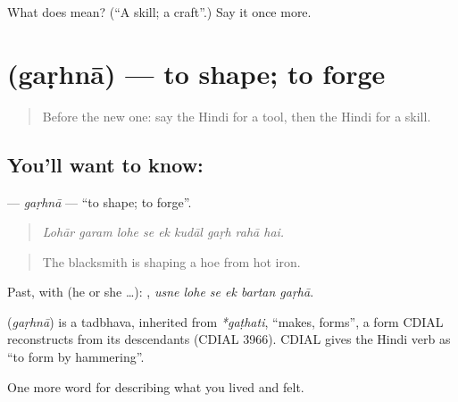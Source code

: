 \begin{tcolorbox}[breakable,colback=teal!4,colframe=teal!35!black,title={Before you move on}]
What does  mean? (\textquotedblleft{}A skill; a craft\textquotedblright{}.) Say it once more.
\end{tcolorbox}
\section[\texorpdfstring{\hi{गढ़ना} (gaṛhnā)}{गढ़ना (gaṛhnā)}]{ (gaṛhnā) — to shape; to forge}

\label{lesson:HI-C506-garhna}



\begin{quote}
Before the new one: say the Hindi for a tool, then the Hindi for a skill.
\end{quote}

\subsection*{You'll want to know: }
\textbf{} — \emph{gaṛhnā} — \textquotedblleft{}to shape; to forge\textquotedblright{}.

\begin{quote}
        
\end{quote}

\begin{quote}
\emph{Lohār garam lohe se ek kudāl gaṛh rahā hai.}
\end{quote}

\begin{quote}
The blacksmith is shaping a hoe from hot iron.
\end{quote}

Past, with  (he or she …):      , \emph{usne lohe se ek bartan gaṛhā}.

\begin{cousinweb}
\textbf{} (\emph{gaṛhnā}) is a tadbhava, inherited from \emph{*gaṭhati}, \textquotedblleft{}makes, forms\textquotedblright{}, a form CDIAL reconstructs from its descendants (CDIAL 3966). CDIAL gives the Hindi verb as \textquotedblleft{}to form by hammering\textquotedblright{}.
\end{cousinweb}

\begin{grammarlens}[title={What you've built}]
One more word for describing what you lived and felt.
\end{grammarlens}

